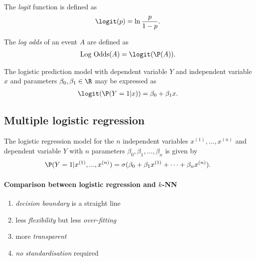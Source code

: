 \documentclass{article}
\begin{document}
\begin{definition}
	The \emph{logit} function is defined as
	\begin{align*}
		\logit(p) = \ln\frac{p}{1-p}.
	\end{align*}
\end{definition}

\begin{definition}
	The \emph{log odds} of an event $A$ are defined as
	\begin{align*}
		\text{Log Odds}(A)=\logit(\P(A)).
	\end{align*}
\end{definition}

\begin{corollary}
	The logistic prediction model with dependent variable $Y$ and
	independent variable $x$ and parameters $\beta_0,\beta_1\in\R$
	may be expressed as
	\begin{align*}
		\logit(\P(Y=1|x)) = \beta_0 + \beta_1 x.
	\end{align*}
\end{corollary}

\subsection{Multiple logistic regression}

\begin{definition}
	The logistic regression model for the $n$ independent variables $x^{(1)},
		..., x^{(n)}$ and dependent variable $Y$ with $n$ parameters
	$\beta_0,\beta_1, ..., \beta_n$ is given by
	\begin{align*}
		\P(Y=1|x^{(1)},...,x^{(n)})=\sigma(\beta_0+\beta_1 x^{(1)}+\cdots + \beta_n x^{(n)}).
	\end{align*}
\end{definition}

\paragraph{Comparison between logistic regression and $k$-NN}
\begin{enumerate}
	\item \emph{decision boundary} is a straight line
	\item less \emph{flexibility} but less \emph{over-fitting}
	\item more \emph{transparent}
	\item \emph{no standardisation} required
\end{enumerate}
\end{document}
